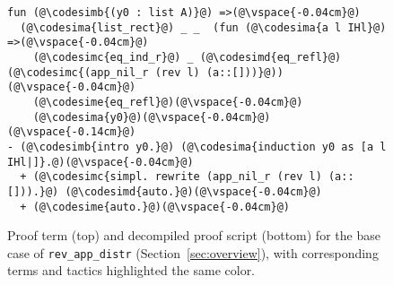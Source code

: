 \begin{figure}
\begin{lstlisting}
fun (@\codesimb{(y0 : list A)}@) =>(@\vspace{-0.04cm}@)
  (@\codesima{list_rect}@) _ _  (fun (@\codesima{a l IHl}@) =>(@\vspace{-0.04cm}@)
    (@\codesimc{eq_ind_r}@) _ (@\codesimd{eq_refl}@) (@\codesimc{(app_nil_r (rev l) (a::[]))}@))(@\vspace{-0.04cm}@)
    (@\codesime{eq_refl}@)(@\vspace{-0.04cm}@)
    (@\codesima{y0}@)(@\vspace{-0.04cm}@)
(@\vspace{-0.14cm}@)
- (@\codesimb{intro y0.}@) (@\codesima{induction y0 as [a l IHl|]}.@)(@\vspace{-0.04cm}@)
  + (@\codesimc{simpl. rewrite (app_nil_r (rev l) (a::[])).}@) (@\codesimd{auto.}@)(@\vspace{-0.04cm}@)
  + (@\codesime{auto.}@)(@\vspace{-0.04cm}@)
\end{lstlisting}
\vspace{-0.4cm}
\caption{Proof term (top) and decompiled proof script (bottom) for the base case of 
\lstinline{rev_app_distr} (Section~\ref{sec:overview}), with corresponding terms and tactics 
highlighted the same color.}
\vspace{-0.25cm}
\label{fig:rainbow}
\end{figure}

